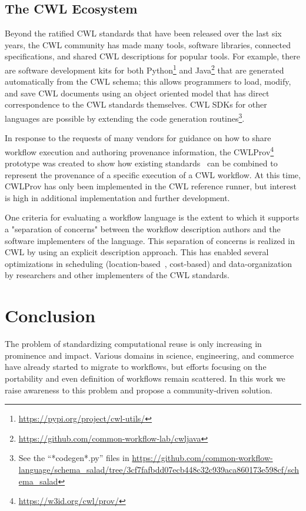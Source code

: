 \documentclass[sigconf,authordraft]{acmart}
\begin{document}
\subsection{The CWL Ecosystem}

Beyond the ratified CWL standards that have been released over the last six years, the CWL community has made many tools, software libraries, connected specifications, and shared CWL descriptions for popular tools. For example, there are software development kits for both Python\footnote{\url{https://pypi.org/project/cwl-utils/}} and Java\footnote{\url{https://github.com/common-workflow-lab/cwljava}} that are generated automatically from the CWL schema; this allows programmers to load, modify, and save CWL documents using an object oriented model that has direct correspondence to the CWL standards themselves. CWL SDKs for other languages are possible by extending the code generation routines\footnote{See the “*codegen*.py” files in \url{https://github.com/common-workflow-language/schema_salad/tree/3cf7fafbdd07ecb448c32c939aca860173e598cf/schema_salad}}.

In response to the requests of many vendors for guidance on how to share workflow execution and authoring provenance information, the CWLProv\footnote{\url{https://w3id.org/cwl/prov/}} prototype was created to show how existing standards~\cite{belhajjame_using_2015,kunze_bagit_2018,missier_w3c_2013} can be combined to represent the provenance of a specific execution of a CWL workflow. At this time, CWLProv has only been implemented in the CWL reference runner, but interest is high in additional implementation and further development.

One criteria for evaluating a workflow language is the extent to which it supports a "separation of concerns" between the workflow description authors and the software implementers of the language. This separation of concerns is realized in CWL by using an explicit description approach. This has enabled several optimizations in scheduling (location-based~\cite{jiang_tr-19-01_2019}, cost-based\cite{jiang_pivot_2019}) and data-organization by researchers and other implementers of the CWL standards.

\section{Conclusion}

The problem of standardizing computational reuse is only increasing in prominence and impact. Various domains in science, engineering, and commerce have already started to migrate to workflows, but efforts focusing on the portability and even definition of workflows remain scattered. In this work we raise awareness to this problem and propose a community-driven solution.
\end{document}
